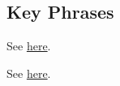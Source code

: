 \subsection{Key Phrases} %
	\label{CHRIST-PHRASES}

	\begin{compactdesc}
	
		\item[light of Christ] See \hyperref[LIGHT-PHRASES]{here}.
		
		\item[spirit of Christ] See \hyperref[SPIRIT-PHRASES]{here}.
		
			
	\end{compactdesc}
	


	
		
